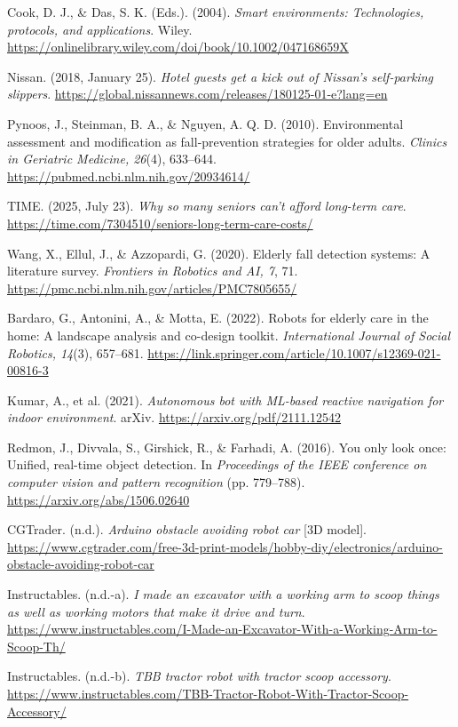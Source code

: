 \documentclass[12pt]{article}
\begin{document}
Cook, D. J., \& Das, S. K. (Eds.). (2004). \textit{Smart environments: Technologies, protocols, and applications}. Wiley. \url{https://onlinelibrary.wiley.com/doi/book/10.1002/047168659X}

Nissan. (2018, January 25). \textit{Hotel guests get a kick out of Nissan's self-parking slippers}. \url{https://global.nissannews.com/releases/180125-01-e?lang=en}

Pynoos, J., Steinman, B. A., \& Nguyen, A. Q. D. (2010). Environmental assessment and modification as fall-prevention strategies for older adults. \textit{Clinics in Geriatric Medicine, 26}(4), 633--644. \url{https://pubmed.ncbi.nlm.nih.gov/20934614/}

TIME. (2025, July 23). \textit{Why so many seniors can't afford long-term care}. \url{https://time.com/7304510/seniors-long-term-care-costs/}

Wang, X., Ellul, J., \& Azzopardi, G. (2020). Elderly fall detection systems: A literature survey. \textit{Frontiers in Robotics and AI, 7}, 71. \url{https://pmc.ncbi.nlm.nih.gov/articles/PMC7805655/}

Bardaro, G., Antonini, A., \& Motta, E. (2022). Robots for elderly care in the home: A landscape analysis and co-design toolkit. \textit{International Journal of Social Robotics, 14}(3), 657--681. \url{https://link.springer.com/article/10.1007/s12369-021-00816-3}

Kumar, A., et al. (2021). \textit{Autonomous bot with ML-based reactive navigation for indoor environment}. arXiv. \url{https://arxiv.org/pdf/2111.12542}

Redmon, J., Divvala, S., Girshick, R., \& Farhadi, A. (2016). You only look once: Unified, real-time object detection. In \textit{Proceedings of the IEEE conference on computer vision and pattern recognition} (pp. 779--788). \url{https://arxiv.org/abs/1506.02640}

CGTrader. (n.d.). \textit{Arduino obstacle avoiding robot car} [3D model]. \url{https://www.cgtrader.com/free-3d-print-models/hobby-diy/electronics/arduino-obstacle-avoiding-robot-car}

Instructables. (n.d.-a). \textit{I made an excavator with a working arm to scoop things as well as working motors that make it drive and turn}. \url{https://www.instructables.com/I-Made-an-Excavator-With-a-Working-Arm-to-Scoop-Th/}

Instructables. (n.d.-b). \textit{TBB tractor robot with tractor scoop accessory}. \url{https://www.instructables.com/TBB-Tractor-Robot-With-Tractor-Scoop-Accessory/}
\end{document}
